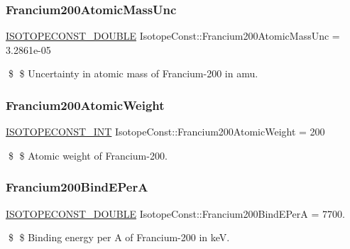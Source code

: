\subsubsection{\texorpdfstring{Francium200\+Atomic\+Mass\+Unc}{Francium200AtomicMassUnc}}
{\footnotesize\ttfamily \mbox{\hyperlink{group___isotope_const-_macros_ga8f45a7272ce02c0b4c65c44636ed719a}{I\+S\+O\+T\+O\+P\+E\+C\+O\+N\+S\+T\+\_\+\+D\+O\+U\+B\+LE}} Isotope\+Const\+::\+Francium200\+Atomic\+Mass\+Unc = 3.\+2861e-\/05}

\$ \$ Uncertainty in atomic mass of Francium-\/200 in amu. \mbox{\label{group___isotope_const-_francium-_fr200_ga09a0163c1372da0ae34b962f476fe0a6}} 
\subsubsection{\texorpdfstring{Francium200\+Atomic\+Weight}{Francium200AtomicWeight}}
{\footnotesize\ttfamily \mbox{\hyperlink{group___isotope_const-_macros_ga5f18360b3e99483a35c32d789e62621c}{I\+S\+O\+T\+O\+P\+E\+C\+O\+N\+S\+T\+\_\+\+I\+NT}} Isotope\+Const\+::\+Francium200\+Atomic\+Weight = 200}

\$ \$ Atomic weight of Francium-\/200. \mbox{\label{group___isotope_const-_francium-_fr200_gad8c180a6cfce09badce79ee2aed384ae}} 
\subsubsection{\texorpdfstring{Francium200\+Bind\+E\+PerA}{Francium200BindEPerA}}
{\footnotesize\ttfamily \mbox{\hyperlink{group___isotope_const-_macros_ga8f45a7272ce02c0b4c65c44636ed719a}{I\+S\+O\+T\+O\+P\+E\+C\+O\+N\+S\+T\+\_\+\+D\+O\+U\+B\+LE}} Isotope\+Const\+::\+Francium200\+Bind\+E\+PerA = 7700.}

\$ \$ Binding energy per A of Francium-\/200 in keV. \mbox{\label{group___isotope_const-_francium-_fr200_ga96af6a8d5d9201a63b1821abd2d18c07}} 
